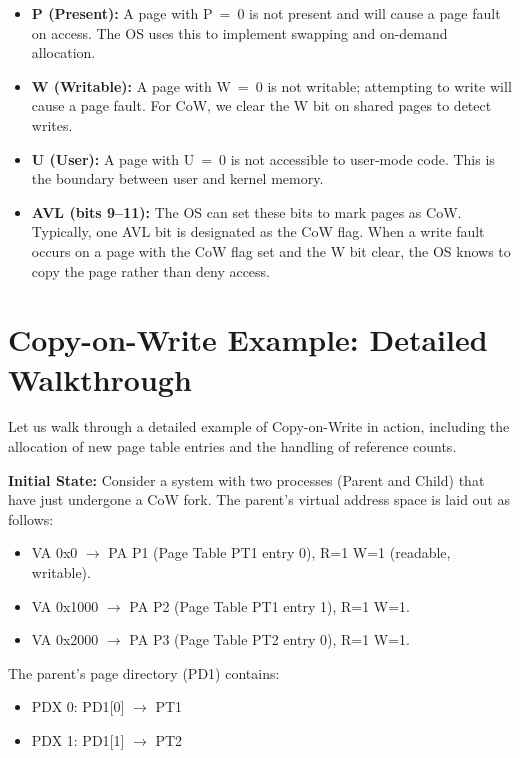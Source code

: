 \documentclass[11pt]{article}
\begin{document}
\begin{itemize}
    \item \textbf{P (Present):} A page with P~=~0 is not present and will cause a page fault on access. The OS uses this to implement swapping and on-demand allocation.
    \item \textbf{W (Writable):} A page with W~=~0 is not writable; attempting to write will cause a page fault. For CoW, we clear the W bit on shared pages to detect writes.
    \item \textbf{U (User):} A page with U~=~0 is not accessible to user-mode code. This is the boundary between user and kernel memory.
    \item \textbf{AVL (bits 9--11):} The OS can set these bits to mark pages as CoW. Typically, one AVL bit is designated as the CoW flag. When a write fault occurs on a page with the CoW flag set and the W bit clear, the OS knows to copy the page rather than deny access.
\end{itemize}

\section{Copy-on-Write Example: Detailed Walkthrough}

Let us walk through a detailed example of Copy-on-Write in action, including the allocation of new page table entries and the handling of reference counts.

\textbf{Initial State:} Consider a system with two processes (Parent and Child) that have just undergone a CoW fork. The parent's virtual address space is laid out as follows:

\begin{itemize}
    \item VA 0x0 $\rightarrow$ PA P1 (Page Table PT1 entry 0), R=1 W=1 (readable, writable).
    \item VA 0x1000 $\rightarrow$ PA P2 (Page Table PT1 entry 1), R=1 W=1.
    \item VA 0x2000 $\rightarrow$ PA P3 (Page Table PT2 entry 0), R=1 W=1.
\end{itemize}

The parent's page directory (PD1) contains:
\begin{itemize}
    \item PDX 0: PD1[0] $\rightarrow$ PT1
    \item PDX 1: PD1[1] $\rightarrow$ PT2
\end{itemize}
\end{document}
